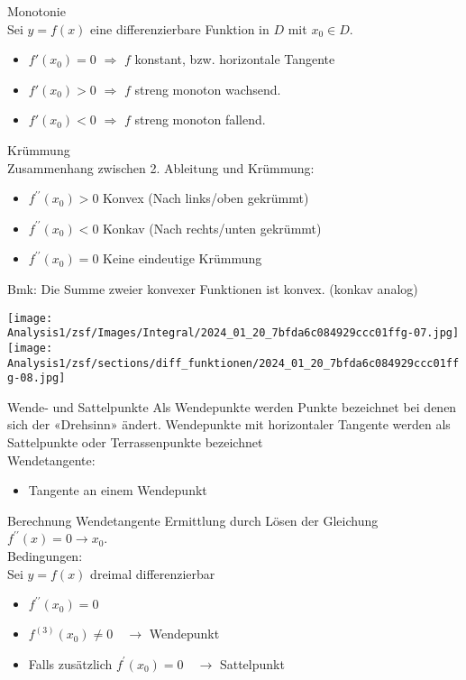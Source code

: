 \begin{definition}[breakable]{Monotonie}\\
    Sei $y=f(x)$ eine differenzierbare Funktion in $D$ mit $x_{0} \in D$.
    \begin{itemize}
        \item $f'( x_{0}) = 0$ $ \Rightarrow$   $f$ konstant, bzw. horizontale Tangente
        \item $f'( x_{0}) > 0 $ $ \Rightarrow$  $f$  streng monoton wachsend.
        \item $f'( x_{0}) < 0 $ $ \Rightarrow$ $f$ streng monoton fallend.
    \end{itemize}
\end{definition}
\begin{theorem}{Krümmung}\\
    Zusammenhang zwischen 2. Ableitung und Krümmung:
    \begin{itemize}
      \item $f^{\prime \prime}\left(x_{0}\right)>0$ Konvex (Nach links/oben gekrümmt)
      \item $f^{\prime \prime}\left(x_{0}\right)<0$ Konkav (Nach rechts/unten gekrümmt)
      \item $f^{\prime \prime}\left(x_{0}\right)=0$ Keine eindeutige Krümmung
    \end{itemize}
    Bmk: Die Summe zweier konvexer Funktionen ist konvex. (konkav analog)
\end{theorem}

\texttt{[image: Analysis1/zsf/Images/Integral/2024\_01\_20\_7bfda6c084929ccc01ffg-07.jpg]}
\texttt{[image: Analysis1/zsf/sections/diff\_funktionen/2024\_01\_20\_7bfda6c084929ccc01ffg-08.jpg]}
\begin{definition}{Wende- und Sattelpunkte}
    Als Wendepunkte werden Punkte bezeichnet bei denen sich der «Drehsinn» ändert. Wendepunkte mit horizontaler Tangente werden als Sattelpunkte oder Terrassenpunkte bezeichnet\\

Wendetangente:
\begin{itemize}
  \item Tangente an einem Wendepunkt
\end{itemize}
\end{definition}



\begin{KR}{Berechnung Wendetangente}
    Ermittlung durch Lösen der Gleichung $f^{\prime \prime}(x)=0 \rightarrow x_{0}$.\\
    Bedingungen:\\
    Sei $y=f(x)$ dreimal differenzierbar

\begin{itemize}
  \item $f^{\prime \prime}\left(x_{0}\right)=0$
  \item $f^{(3)}\left(x_{0}\right) \neq 0 \quad \rightarrow$ Wendepunkt
  \item Falls zusätzlich $f^{\prime}\left(x_{0}\right)=0 \quad \rightarrow$ Sattelpunkt
\end{itemize}
    
\end{KR}

